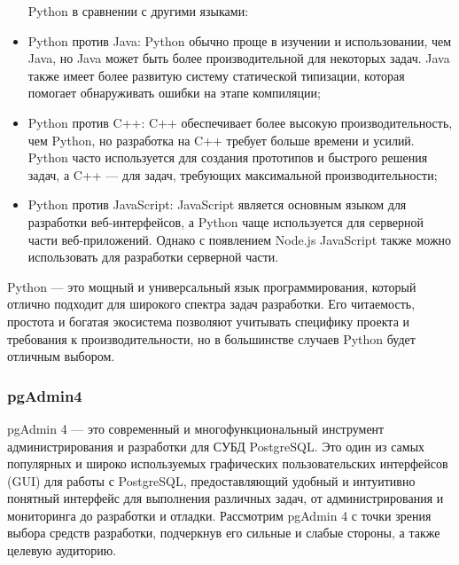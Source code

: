 \begin{itemize}
Python в сравнении с другими языками:

\item	Python против Java: Python обычно проще в изучении и использовании, чем Java, но Java может быть более производительной для некоторых задач. Java также имеет более развитую систему статической типизации, которая помогает обнаруживать ошибки на этапе компиляции;

\item	Python против C++: C++ обеспечивает более высокую производительность, чем Python, но разработка на C++ требует больше времени и усилий. Python часто используется для создания прототипов и быстрого решения задач, а C++ — для задач, требующих максимальной производительности;

\item	Python против JavaScript: JavaScript является основным языком для разработки веб-интерфейсов, а Python чаще используется для серверной части веб-приложений. Однако с появлением Node.js JavaScript также можно использовать для разработки серверной части.
\end{itemize}
Python — это мощный и универсальный язык программирования, который отлично подходит для широкого спектра задач разработки. Его читаемость, простота и богатая экосистема позволяют учитывать специфику проекта и требования к производительности, но в большинстве случаев Python будет отличным выбором.

\subsubsection{pgAdmin4}

pgAdmin 4 — это современный и многофункциональный инструмент администрирования и разработки для СУБД PostgreSQL. Это один из самых популярных и широко используемых графических пользовательских интерфейсов (GUI) для работы с PostgreSQL, предоставляющий удобный и интуитивно понятный интерфейс для выполнения различных задач, от администрирования и мониторинга до разработки и отладки. Рассмотрим pgAdmin 4 с точки зрения выбора средств разработки, подчеркнув его сильные и слабые стороны, а также целевую аудиторию.

